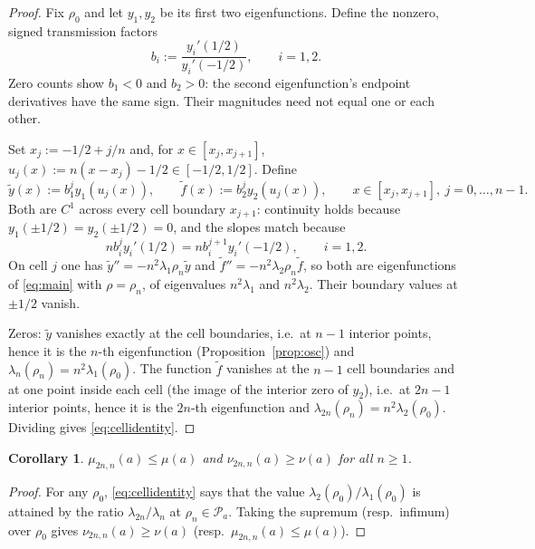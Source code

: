 ﻿\documentclass[11pt]{article}
\newtheorem{corollary}[theorem]{Corollary}
\begin{document}
\begin{proof}
 Fix $\rho_0$ and let $y_1,y_2$ be its first two eigenfunctions.
 Define the nonzero, signed transmission factors
 \[
 b_i:=\frac{y_i'(1/2)}{y_i'(-1/2)},\qquad i=1,2.
 \]
 Zero counts show $b_1<0$ and $b_2>0$: the second eigenfunction's
 endpoint derivatives have the same sign. Their magnitudes need not
 equal one or each other.

	Set $x_j:=-1/2+j/n$ and, for $x\in[x_j,x_{j+1}]$,
	$u_j(x):=n(x-x_j)-1/2\in[-1/2,1/2]$.  Define
	\begin{equation*}
  \widetilde y(x):=b_1^j y_1(u_j(x)),\qquad
  \widetilde f(x):=b_2^j y_2(u_j(x)),
		\qquad x\in[x_j,x_{j+1}],\ j=0,\ldots,n-1.
	\end{equation*}
	Both are $C^1$ across every cell boundary $x_{j+1}$: continuity holds
	because $y_1(\pm 1/2)=y_2(\pm 1/2)=0$, and the slopes match because
	\begin{equation*}
  n b_i^j y_i'(1/2)=n b_i^{j+1}y_i'(-1/2),\qquad i=1,2.
	\end{equation*}
	On cell $j$ one has $\widetilde y''=-n^2\lambda_1\rho_n\widetilde y$ and
	$\widetilde f''=-n^2\lambda_2\rho_n\widetilde f$, so both are
	eigenfunctions of \eqref{eq:main} with $\rho=\rho_n$, of eigenvalues
	$n^2\lambda_1$ and $n^2\lambda_2$.  Their boundary values at
	$\pm 1/2$ vanish.

	Zeros: $\widetilde y$ vanishes exactly at the cell boundaries, i.e.\ at
	$n-1$ interior points, hence it is the $n$-th eigenfunction
	(Proposition~\ref{prop:osc}) and
	$\lambda_n(\rho_n)=n^2\lambda_1(\rho_0)$.  The function
	$\widetilde f$ vanishes at the $n-1$ cell boundaries and at one point
	inside each cell (the image of the interior zero of $y_2$), i.e.\ at
	$2n-1$ interior points, hence it is the $2n$-th eigenfunction and
	$\lambda_{2n}(\rho_n)=n^2\lambda_2(\rho_0)$.  Dividing gives
	\eqref{eq:cellidentity}.
\end{proof}

\begin{corollary}\label{cor:lemma1}
	$\mu_{2n,n}(a)\le\mu(a)$ and $\nu_{2n,n}(a)\ge\nu(a)$ for all $n\ge 1$.
\end{corollary}

\begin{proof}
	For any $\rho_0$, \eqref{eq:cellidentity} says that the value
	$\lambda_2(\rho_0)/\lambda_1(\rho_0)$ is attained by the ratio
	$\lambda_{2n}/\lambda_n$ at $\rho_n\in\mathcal P_a$.  Taking the
	supremum (resp.\ infimum) over $\rho_0$ gives
	$\nu_{2n,n}(a)\ge\nu(a)$ (resp.\ $\mu_{2n,n}(a)\le\mu(a)$).
\end{proof}
\end{document}
